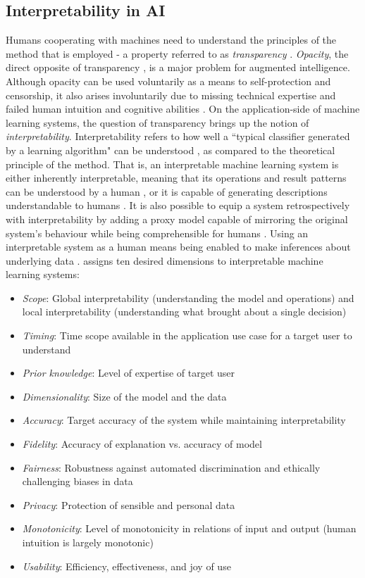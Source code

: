 \subsection{Interpretability in AI}
Humans cooperating with machines need to understand the principles of the method that is employed - a property referred to as \textit{transparency} \cite{kotsiantis2007supervised}. \textit{Opacity}, the direct opposite of transparency \cite{lipton2016mythos}, is a major problem for augmented intelligence. Although opacity can be used voluntarily as a means to self-protection and censorship, it also arises involuntarily due to missing technical expertise and failed human intuition and cognitive abilities \cite{burrell2016machine}.\newline
On the application-side of machine learning systems, the question of transparency brings up the notion of \textit{interpretability}. Interpretability refers to how well a ``typical classifier generated by a learning algorithm" can be understood \cite{kotsiantis2007supervised}, as compared to the theoretical principle of the method. That is, an interpretable machine learning system is either inherently interpretable, meaning that its operations and result patterns can be understood by a human \cite{biran2017explanation, ventocilla2018taxonomy}, or it is capable of generating descriptions understandable to humans \cite{gilpin2018explaining}. It is also possible to equip a system retrospectively with interpretability by adding a proxy model capable of mirroring the original system's behaviour while being comprehensible for humans \cite{guidotti2018survey}. Using an interpretable system as a human means being enabled to make inferences about underlying data \cite{ventocilla2018taxonomy}.\newline
\cite{guidotti2018survey} assigns ten desired dimensions to interpretable machine learning systems:
\begin{itemize}
	\item \textit{Scope}: Global interpretability (understanding the model and operations) and local interpretability (understanding what brought about a single decision)
	\item \textit{Timing}: Time scope available in the application use case for a target user to understand 
	\item \textit{Prior knowledge}: Level of expertise of target user
	\item \textit{Dimensionality}: Size of the model and the data
	\item \textit{Accuracy}: Target accuracy of the system while maintaining interpretability
	\item \textit{Fidelity}: Accuracy of explanation vs. accuracy of model
	\item \textit{Fairness}: Robustness against automated discrimination and ethically challenging biases in data
	\item \textit{Privacy}: Protection of sensible and personal data
	\item \textit{Monotonicity}: Level of monotonicity in relations of input and output (human intuition is largely monotonic)
	\item \textit{Usability}: Efficiency, effectiveness, and joy of use
\end{itemize}
